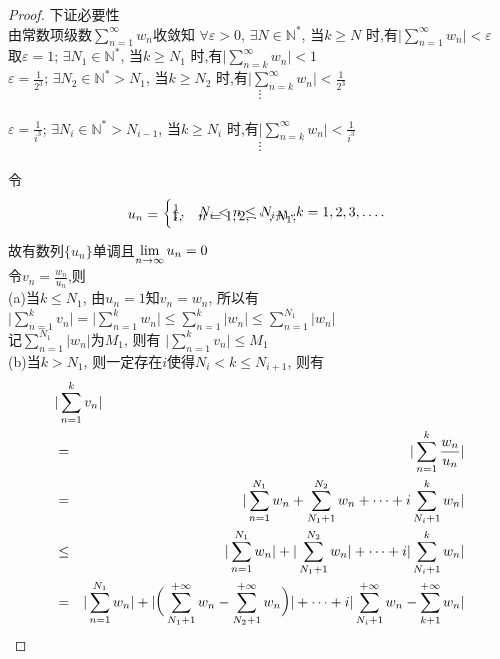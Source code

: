 \documentclass[a4paper,12pt,twoside]{ctexart}
\begin{document}
\begin{proof}
    下证必要性\\
    由常数项级数$\sum\limits_{n=1}^{\infty}{w_n}$收敛知
    $\forall\varepsilon>0$, $\exists  N\in\mathbb{ N^{*}}$, 当$k\geq N$ 时,有${\vert{\sum\limits_{n=1}^{\infty}{w_n}}\vert}<\varepsilon$\\
取$\varepsilon=1$; $\exists  N_1\in\mathbb{ N^{*}}$, 当$k\geq N_1$ 时,有${\vert{\sum\limits_{n=k}^{\infty}{w_n}}\vert}<1$\\
$\varepsilon=\frac{1}{2^3}$; $\exists  N_2\in\mathbb{ N^{*}}>N_{1}$, 当$k\geq N_2$ 时,有${\vert{\sum\limits_{n=k}^{\infty}{w_n}}\vert}<\frac{1}{2^3}$\\
$$\vdots$$\\
$\varepsilon=\frac{1}{i^3}$; $\exists  N_i\in\mathbb{ N^{*}}>N_{i-1}$, 当$k\geq N_i$ 时,有${\vert{\sum\limits_{n=k}^{\infty}{w_n}}\vert}<\frac{1}{i^3}$\\
$$\vdots$$\\
令
$$
{u_n}=\bigg\{\!\!\!
    \begin{array}{ll}
    1,&n=1,2,\idots,N_1;\\[-15pt]
    \frac{1}{i},&N_i<n\leq N_{i+1}, k=1,2,3,\dots.
    \end{array}
$$
故有数列$\{u_n\}$单调且$\displaystyle\lim_{n\to{\infty}}u_n=0$\\
令$v_n=\frac{w_n}{u_n}$,则\\
(a)当$k\leq N_1$, 由$u_n=1$知$v_n=w_n$, 所以有\\
$\vert{\sum\limits_{n=1}^{k}{v_n}}\vert=\vert{\sum\limits_{n=1}^{k}{w_n}}\vert\leq{\sum\limits_{n=1}^{k}{\vert{w_n}\vert}}
\leq{\sum\limits_{n=1}^{N_1}{\vert{w_n}\vert}}$\\
记${\sum\limits_{n=1}^{N_1}{\vert{w_n}\vert}}$为$ M_1$, 则有 ${\vert{\sum\limits_{n=1}^{k}{v_n}}\vert}\leq M_1$\\
(b)当$k>N_1$, 则一定存在$i$使得$N_i<k\leq N_{i+1}$, 则有\\
\begin{eqnarray*}
\lefteqn{\vert\sum_{n=1}^{k}v_n\vert}\\
&=&\vert\sum_{n=1}^{k}\frac{w_n}{u_n}\vert\\
&=&\vert\sum_{n=1}^{N_1}{w_n}+\sum_{N_1+1}^{N_2}w_n +\dots+i\sum_{N_i+1}^{k}w_n\vert\\
&\le&\vert\sum_{n=1}^{N_1}w_n\vert +\vert\sum_{N_1+1}^{N_2}w_n\vert+\dots +i\vert\sum_{N_i+1}^{k}w_n\vert\\
&=&\vert\sum_{n=1}^{N_1}w_n\vert+\vert\bigg(\sum_{N_1+1}^{+\infty}w_n -\sum_{N_2+1}^{+\infty}w_n\bigg)\vert +\dots+i\vert\sum_{N_i+1}^{+\infty}w_n -\sum_{k+1}^{+\infty}w_n\vert\\

\end{eqnarray*}
\end{proof}
\end{document}
